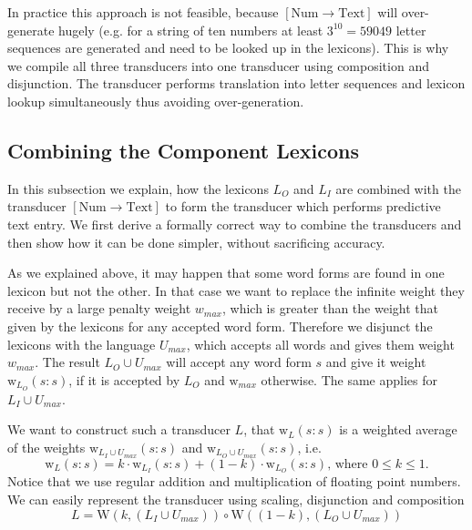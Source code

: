 \documentclass[a4paper,conference]{IEEEtran}
\begin{document}
In practice this approach is not feasible, because
$[\mathrm{Num}\rightarrow\mathrm{Text}]$ will over-generate hugely
(e.g. for a string of ten numbers at least $3^{10} = 59049$ letter
sequences are generated and need to be looked up in the
lexicons). This is why we compile all three transducers into one
transducer using composition and disjunction. The transducer performs
translation into letter sequences and lexicon lookup simultaneously
thus avoiding over-generation.

\subsection{Combining the Component Lexicons}

In this subsection we explain, how the lexicons $L_O$ and $L_I$ are
combined with the transducer $[\mathrm{Num}\rightarrow\mathrm{Text}]$
to form the transducer which performs predictive text entry. We first
derive a formally correct way to combine the transducers and then show
how it can be done simpler, without sacrificing accuracy.

As we explained above, it may happen that some word forms are found in
one lexicon but not the other. In that case we want to replace the
infinite weight they receive by a large penalty weight $w_{max}$,
which is greater than the weight that given by the lexicons for any
accepted word form. Therefore we disjunct the lexicons with the
language $U_{max}$, which accepts all words and gives them weight
$w_{max}$. The result $L_O \cup U_{max}$ will accept any word form $s$
and give it weight $\mathrm{w}_{L_O}(s\mathrm{:}s)$, if it is accepted by $L_O$
and $\mathrm{w}_{max}$ otherwise. The same applies for $L_I \cup U_{max}$.

We want to construct such a transducer $L$, that $\mathrm{w}_L(s\mathrm{:}s)$
is a weighted average of the weights $\mathrm{w}_{L_I \cup U_{max}}(s\mathrm{:}s)$ and
$\mathrm{w}_{L_O \cup U_{max}}(s\mathrm{:}s)$, i.e.
\begin{equation}
  \mathrm{w}_L(s\mathrm{:}s) = k\cdot \mathrm{w}_{L_I}(s\mathrm{:}s) + (1 - k)\cdot \mathrm{w}_{L_O}(s\mathrm{:}s)\text{, where }0\leq k \leq 1\text{.}
\end{equation}
Notice that we use regular addition and multiplication of floating
point numbers. We can easily represent the transducer using scaling, disjunction and composition
\begin{equation}
  L = \mathrm{W}(k,(L_I \cup U_{max})) \circ \mathrm{W}((1-k),(L_O \cup U_{max}))
\end{equation}
\end{document}
